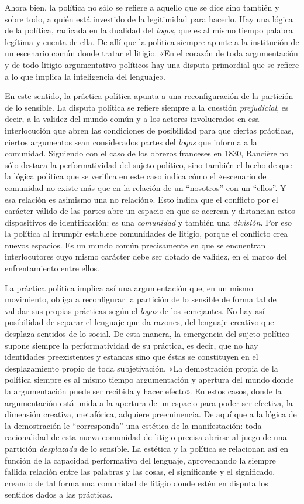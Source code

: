 Ahora bien, la política no sólo se refiere a aquello que se dice sino también y sobre todo, a quién está investido de la legitimidad para hacerlo. Hay una lógica de la política, radicada en la dualidad del\emph{ logos}, que es al mismo tiempo palabra legítima y cuenta de ella. De allí que la política siempre apunte a la institución de un escenario común donde tratar el litigio. «En el corazón de toda argumentación y de todo litigio argumentativo políticos hay una disputa primordial que se refiere a lo que implica la inteligencia del lenguaje».

En este sentido, la práctica política apunta a una reconfiguración de la partición de lo sensible. La disputa política se refiere siempre a la cuestión \emph{prejudicial}, es decir, a la validez del mundo común y a los actores involucrados en esa interlocución que abren las condiciones de posibilidad para que ciertas prácticas, ciertos argumentos sean considerados partes del \emph{logos} que informa a la comunidad. Siguiendo con el caso de los obreros franceses en 1830, Rancière no sólo destaca la performatividad del sujeto político, sino también el hecho de que la lógica política que se verifica en este caso indica cómo el «escenario de comunidad no existe más que en la relación de un ``nosotros'' con un ``ellos''. Y esa relación es asimismo una no relación». Esto indica que el conflicto por el carácter válido de las partes abre un espacio en que se acercan y distancian estos dispositivos de identificación: es una \emph{comunidad} y también una \emph{división}. Por eso la política al irrumpir establece comunidades de litigio, porque el conflicto crea nuevos espacios. Es un mundo común precisamente en que se encuentran interlocutores cuyo mismo carácter debe ser dotado de validez, en el marco del enfrentamiento entre ellos.

La práctica política implica así una argumentación que, en un mismo movimiento, obliga a reconfigurar la partición de lo sensible de forma tal de validar sus propias prácticas según el \emph{logos} de los semejantes. No hay así posibilidad de separar el lenguaje que da razones, del lenguaje creativo que desplaza sentidos de lo social. De esta manera, la emergencia del sujeto político supone siempre la performatividad de su práctica, es decir, que no hay identidades preexistentes y estancas sino que éstas se constituyen en el desplazamiento propio de toda subjetivación. «La demostración propia de la política siempre es al mismo tiempo argumentación y apertura del mundo donde la argumentación puede ser recibida y hacer efecto». En estos casos, donde la argumentación está unida a la apertura de un espacio para poder ser efectiva, la dimensión creativa, metafórica, adquiere preeminencia. De aquí que a la lógica de la demostración le ``corresponda'' una estética de la manifestación: toda racionalidad de esta nueva comunidad de litigio precisa abrirse al juego de una partición \emph{desplazada} de lo sensible. La estética y la política se relacionan así en función de la capacidad performativa del lenguaje, aprovechando la siempre fallida relación entre las palabras y las cosas, el significante y el significado, creando de tal forma una comunidad de litigio donde estén en disputa los sentidos dados a las prácticas.

